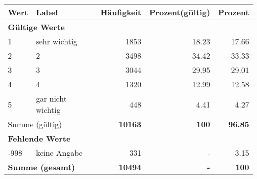      \begin{longtable}{lXrrr}
     \toprule
     \textbf{Wert} & \textbf{Label} & \textbf{Häufigkeit} & \textbf{Prozent(gültig)} & \textbf{Prozent} \\
     \endhead
     \midrule
     \multicolumn{5}{l}{\textbf{Gültige Werte}}\\

     1 &
     \multicolumn{1}{X}{ sehr wichtig   } &


       \num{1853} &
       \num[round-mode=places,round-precision=2]{18,23} &
         \num[round-mode=places,round-precision=2]{17,66} \\

     2 &
     \multicolumn{1}{X}{ 2   } &


       \num{3498} &
       \num[round-mode=places,round-precision=2]{34,42} &
         \num[round-mode=places,round-precision=2]{33,33} \\

     3 &
     \multicolumn{1}{X}{ 3   } &


       \num{3044} &
       \num[round-mode=places,round-precision=2]{29,95} &
         \num[round-mode=places,round-precision=2]{29,01} \\

     4 &
     \multicolumn{1}{X}{ 4   } &


       \num{1320} &
       \num[round-mode=places,round-precision=2]{12,99} &
         \num[round-mode=places,round-precision=2]{12,58} \\

     5 &
     \multicolumn{1}{X}{ gar nicht wichtig   } &


       \num{448} &
       \num[round-mode=places,round-precision=2]{4,41} &
         \num[round-mode=places,round-precision=2]{4,27} \\
     \midrule
     \multicolumn{2}{l}{Summe (gültig)} &
       \textbf{\num{10163}} &
     \textbf{100} &
       \textbf{\num[round-mode=places,round-precision=2]{96,85}} \\
     \multicolumn{5}{l}{\textbf{Fehlende Werte}}\\
       -998 &
       keine Angabe &
         \num{331} &
        - &
         \num[round-mode=places,round-precision=2]{3,15} \\
     \midrule
     \multicolumn{2}{l}{\textbf{Summe (gesamt)}} &
          \textbf{\num{10494}} &
        \textbf{-} &
        \textbf{100} \\
     \bottomrule
     \end{longtable}
     
